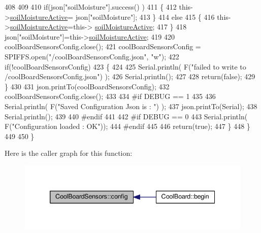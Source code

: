 \begin{DoxyCode}
408 
409             
410             \textcolor{keywordflow}{if}(json[\textcolor{stringliteral}{"soilMoisture"}].success() )
411             \{           
412                 this->\hyperlink{class_cool_board_sensors_ae7971bf527781ac4994309591b78ab89}{soilMoistureActive}= json[\textcolor{stringliteral}{"soilMoisture"}];
413             \}
414             \textcolor{keywordflow}{else}
415             \{
416                 this->\hyperlink{class_cool_board_sensors_ae7971bf527781ac4994309591b78ab89}{soilMoistureActive}=this->
      \hyperlink{class_cool_board_sensors_ae7971bf527781ac4994309591b78ab89}{soilMoistureActive};
417             \}
418             json[\textcolor{stringliteral}{"soilMoisture"}]=this->\hyperlink{class_cool_board_sensors_ae7971bf527781ac4994309591b78ab89}{soilMoistureActive};
419 
420             coolBoardSensorsConfig.close();         
421             coolBoardSensorsConfig = SPIFFS.open(\textcolor{stringliteral}{"/coolBoardSensorsConfig.json"}, \textcolor{stringliteral}{"w"});          
422             \textcolor{keywordflow}{if}(!coolBoardSensorsConfig)
423             \{
424 
425                 Serial.println( F(\textcolor{stringliteral}{"failed to write to /coolBoardSensorsConfig.json"}) );
426                 Serial.println();
427 
428                 \textcolor{keywordflow}{return}(\textcolor{keyword}{false});          
429             \}  
430 
431             json.printTo(coolBoardSensorsConfig);
432             coolBoardSensorsConfig.close();         
433             
434 \textcolor{preprocessor}{        #if DEBUG == 1}
435 
436             Serial.println( F(\textcolor{stringliteral}{"Saved Configuration Json is : "}) );
437             json.printTo(Serial);
438             Serial.println();
439         
440 \textcolor{preprocessor}{        #endif}
441 
442 \textcolor{preprocessor}{        #if DEBUG == 0}
443             Serial.println( F(\textcolor{stringliteral}{"Configuration loaded : OK"}));
444 \textcolor{preprocessor}{        #endif}
445 
446             \textcolor{keywordflow}{return}(\textcolor{keyword}{true}); 
447         \}
448     \}   
449 
450 \}
\end{DoxyCode}
Here is the caller graph for this function\+:\nopagebreak
\begin{figure}[H]
\begin{center}
\leavevmode
\includegraphics[width=339pt]{de/d46/class_cool_board_sensors_a9a218895c5423375c33c08f2c56fb23a_icgraph}
\end{center}
\end{figure}
\mbox{\label{class_cool_board_sensors_a4902b69f6e628bd6557193758fdd2bae}} 
